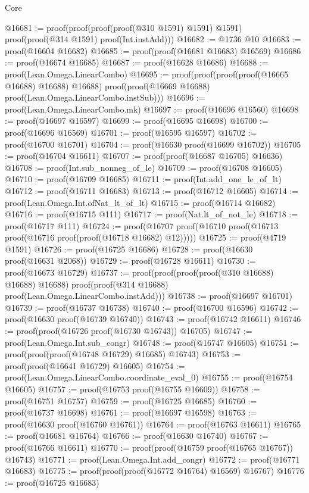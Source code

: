 \begin{lexlean}{Core}
\begin{coremodule}
@16681 := proof(proof(proof(proof(@310 @1591) @1591) @1591)
      proof(proof(@314 @1591) proof(Int.instAdd)))
@16682 := @1736 @10
@16683 := proof(@16604 @16682)
@16685 := proof(proof(@16681 @16683) @16569)
@16686 := proof(@16674 @16685)
@16687 := proof(@16628 @16686)
@16688 := proof(Lean.Omega.LinearCombo)
@16695 := proof(proof(proof(proof(@16665 @16688) @16688) @16688)
      proof(proof(@16669 @16688) proof(Lean.Omega.LinearCombo.instSub)))
@16696 := proof(Lean.Omega.LinearCombo.mk)
@16697 := proof(@16696 @16560)
@16698 := proof(@16697 @16597)
@16699 := proof(@16695 @16698)
@16700 := proof(@16696 @16569)
@16701 := proof(@16595 @16597)
@16702 := proof(@16700 @16701)
@16704 := proof(@16630 proof(@16699 @16702))
@16705 := proof(@16704 @16611)
@16707 := proof(proof(@16687 @16705) @16636)
@16708 := proof(Int.sub_nonneg_of_le)
@16709 := proof(@16708 @16605)
@16710 := proof(@16709 @16685)
@16711 := proof(Int.add_one_le_of_lt)
@16712 := proof(@16711 @16683)
@16713 := proof(@16712 @16605)
@16714 := proof(Lean.Omega.Int.ofNat_lt_of_lt)
@16715 := proof(@16714 @16682)
@16716 := proof(@16715 @111)
@16717 := proof(Nat.lt_of_not_le)
@16718 := proof(@16717 @111)
@16724 := proof(@16707 proof(@16710 proof(@16713 proof(@16716 proof(proof(@16718 @16682) @12)))))
@16725 := proof(@4719 @1591)
@16726 := proof(@16725 @16686)
@16728 := proof(@16630 proof(@16631 @2068))
@16729 := proof(@16728 @16611)
@16730 := proof(@16673 @16729)
@16737 := proof(proof(proof(proof(@310 @16688) @16688) @16688)
      proof(proof(@314 @16688) proof(Lean.Omega.LinearCombo.instAdd)))
@16738 := proof(@16697 @16701)
@16739 := proof(@16737 @16738)
@16740 := proof(@16700 @16596)
@16742 := proof(@16630 proof(@16739 @16740))
@16743 := proof(@16742 @16611)
@16746 := proof(proof(@16726 proof(@16730 @16743)) @16705)
@16747 := proof(Lean.Omega.Int.sub_congr)
@16748 := proof(@16747 @16605)
@16751 := proof(proof(proof(@16748 @16729) @16685) @16743)
@16753 := proof(proof(@16641 @16729) @16605)
@16754 := proof(Lean.Omega.LinearCombo.coordinate_eval_0)
@16755 := proof(@16754 @16605)
@16757 := proof(@16753 proof(@16755 @16609))
@16758 := proof(@16751 @16757)
@16759 := proof(@16725 @16685)
@16760 := proof(@16737 @16698)
@16761 := proof(@16697 @16598)
@16763 := proof(@16630 proof(@16760 @16761))
@16764 := proof(@16763 @16611)
@16765 := proof(@16681 @16764)
@16766 := proof(@16630 @16740)
@16767 := proof(@16766 @16611)
@16770 := proof(proof(@16759 proof(@16765 @16767)) @16743)
@16771 := proof(Lean.Omega.Int.add_congr)
@16772 := proof(@16771 @16683)
@16775 := proof(proof(proof(@16772 @16764) @16569) @16767)
@16776 := proof(@16725 @16683)

\end{coremodule}
\end{lexlean}
